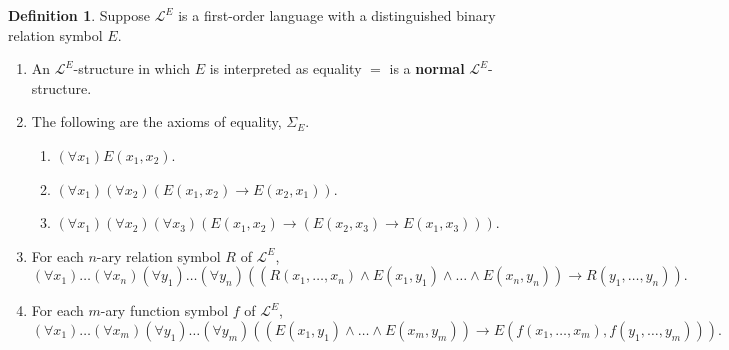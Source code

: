\documentclass{article}
\renewcommand{\L}{\mathcal{L}}
\newcommand{\rb}[1]{\left( #1 \right)}
\newcommand{\impb}[2]{\rb{#1 \rightarrow #2}}
\newcommand{\fab}[1]{\rb{\forall #1}}
\theoremstyle{definition}\newtheorem{definition}{Definition}[subsection]
\theoremstyle{definition}\newtheorem{remark}[definition]{Remark}
\theoremstyle{definition}\newtheorem*{example}{Example}
\theoremstyle{definition}\newtheorem*{note}{Note}
\begin{document}
\begin{definition}
Suppose $ \L^E $ is a first-order language with a distinguished binary relation symbol $ E $.
\begin{enumerate}
\item An $ \L^E $-structure in which $ E $ is interpreted as equality $ = $ is a \textbf{normal} $ \L^E $-structure.
\item The following are the axioms of equality, $ \Sigma_E $.
\begin{enumerate}
\item $ \fab{x_1}E\rb{x_1, x_2} $.
\item $ \fab{x_1}\fab{x_2}\impb{E\rb{x_1, x_2}}{E\rb{x_2, x_1}} $.
\item $ \fab{x_1}\fab{x_2}\fab{x_3}\impb{E\rb{x_1, x_2}}{\impb{E\rb{x_2, x_3}}{E\rb{x_1, x_3}}} $.
\end{enumerate}
\item For each $ n $-ary relation symbol $ R $ of $ \L^E $,
$$ \fab{x_1}\dots\fab{x_n}\fab{y_1}\dots\fab{y_n}\impb{\rb{R\rb{x_1, \dots, x_n} \land E\rb{x_1, y_1} \land \dots \land E\rb{x_n, y_n}}}{R\rb{y_1, \dots, y_n}}. $$
\item For each $ m $-ary function symbol $ f $ of $ \L^E $,
$$ \fab{x_1}\dots\fab{x_m}\fab{y_1}\dots\fab{y_m}\impb{\rb{E\rb{x_1, y_1} \land \dots \land E\rb{x_m, y_m}}}{E\rb{f\rb{x_1, \dots, x_m}, f\rb{y_1, \dots, y_m}}}. $$
\end{enumerate}
\end{definition}
\end{document}

